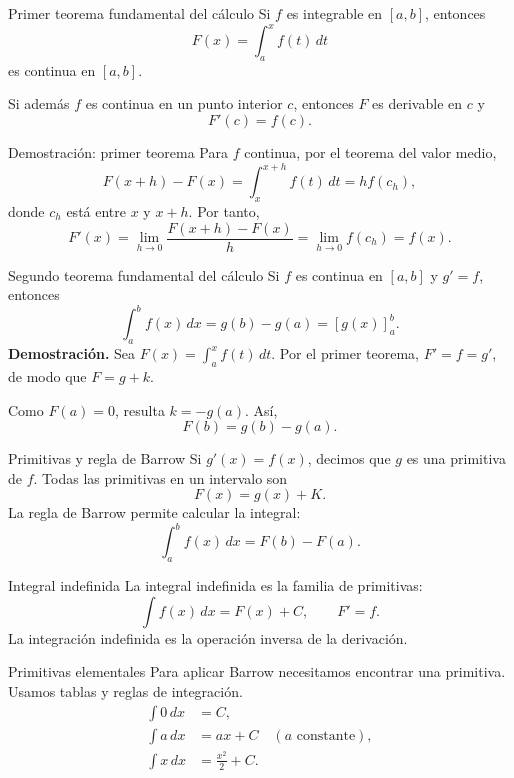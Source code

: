 \documentclass[main.tex]{subfiles}
\begin{document}
\begin{frame}{Primer teorema fundamental del cálculo}
Si $f$ es integrable en $[a,b]$, entonces\[F(x)=\int_a^x f(t)\,dt\]es continua en $[a,b]$.\par\medskip Si además $f$ es continua en un punto interior $c$, entonces $F$ es derivable en $c$ y\[\boxed{F\prime(c)=f(c).}\]
\end{frame}

\begin{frame}{Demostración: primer teorema}
Para $f$ continua, por el teorema del valor medio,\[F(x+h)-F(x)=\int_x^{x+h}f(t)\,dt=h f(c_h),\]donde $c_h$ está entre $x$ y $x+h$. Por tanto,\[F\prime(x)=\lim_{h\to0}\frac{F(x+h)-F(x)}h=\lim_{h\to0}f(c_h)=f(x).\]
\end{frame}

\begin{frame}{Segundo teorema fundamental del cálculo}
\small Si $f$ es continua en $[a,b]$ y $g\prime=f$, entonces\[\boxed{\int_a^b f(x)\,dx=g(b)-g(a)=[g(x)]_a^b.}\]\textbf{Demostración.} Sea $F(x)=\int_a^x f(t)\,dt$. Por el primer teorema, $F\prime=f=g\prime$, de modo que $F=g+k$.\par\medskip Como $F(a)=0$, resulta $k=-g(a)$. Así,\[F(b)=g(b)-g(a).\]
\end{frame}

\begin{frame}{Primitivas y regla de Barrow}
Si $g\prime(x)=f(x)$, decimos que $g$ es una primitiva de $f$. Todas las primitivas en un intervalo son\[F(x)=g(x)+K.\]La regla de Barrow permite calcular la integral:\[\int_a^b f(x)\,dx=F(b)-F(a).\]
\end{frame}

\begin{frame}{Integral indefinida}
La integral indefinida es la familia de primitivas:\[\boxed{\int f(x)\,dx=F(x)+C,\qquad F\prime=f.}\]La integración indefinida es la operación inversa de la derivación.
\end{frame}

\begin{frame}{Primitivas elementales}
Para aplicar Barrow necesitamos encontrar una primitiva. Usamos tablas y reglas de integración.\begin{align*}\int0\,dx&=C,\\\int a\,dx&=ax+C\quad(a\text{ constante}),\\\int x\,dx&=\frac{x^2}{2}+C.\end{align*}
\end{frame}
\end{document}
